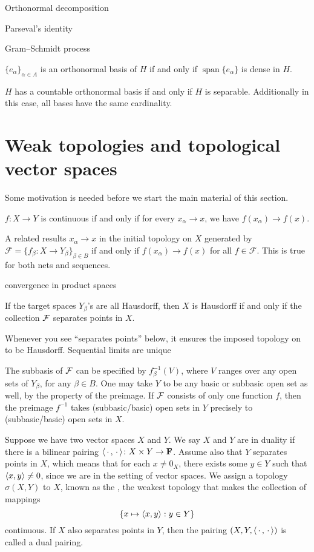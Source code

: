 Orthonormal decomposition

Parseval's identity

Gram--Schmidt process

\begin{thm}
    $\{e_\alpha\}_{\alpha \in A}$ is an orthonormal basis of $H$ if and only if $\operatorname{span}\{e_\alpha\}$ is dense in $H$.
\end{thm}

\begin{thm}
    $H$ has a countable orthonormal basis if and only if $H$ is separable. Additionally in this case, all bases have the same cardinality.
\end{thm}



\section{Weak topologies and topological vector spaces} \label{sec:weak-top-tvs}

Some motivation is needed before we start the main material of this section.



$f\colon X \to Y$ is continuous if and only if for every $x_\alpha \to x$, we have $f(x_\alpha) \to f(x)$.

A related results $x_\alpha \to x$ in the initial topology on $X$ generated by $\mathcal{F} = \{f_\beta \colon X \to Y_\beta\}_{\beta \in B}$ if and only if $f(x_\alpha) \to f(x)$ for all $f \in \mathcal{F}$. This is true for both nets and sequences.

convergence in product spaces

If the target spaces $Y_\beta$'s are all Hausdorff, then $X$ is Hausdorff if and only if the collection $\mathcal{F}$ separates points in $X$.

Whenever you see ``separates points'' below, it ensures the imposed topology on to be Hausdorff. Sequential limits are unique

The subbasis of $\mathcal{F}$ can be specified by $f_\beta^{-1}(V)$, where $V$ ranges over any open sets of $Y_\beta$, for any $\beta \in B$. One may take $Y$ to be any basic or subbasic open set as well, by the property of the preimage. If $\mathcal{F}$ consists of only one function $f$, then the preimage $f^{-1}$ takes (subbasic/basic) open sets in $Y$ precisely to (subbasic/basic) open sets in $X$.

Suppose we have two vector spaces $X$ and $Y$. We say $X$ and $Y$ are in duality if there is a bilinear pairing $\langle \,\cdot\,, \,\cdot\, \rangle\colon X \times Y \to \mathbf F$. Assume also that $Y$ separates points in $X$, which means that for each $x \neq 0_X$, there exists some $y \in Y$ such that $\langle x, y \rangle\neq 0$, since we are in the setting of vector spaces. We assign a topology $\sigma(X,Y)$ to $X$, known as the , the weakest topology that makes the collection of mappings \[
    \{x \mapsto \langle x, y \rangle : y \in Y\}
\] continuous. If $X$ also separates points in $Y$, then the pairing $(X,Y,\langle \,\cdot\,, \,\cdot\, \rangle)$ is called a dual pairing.


